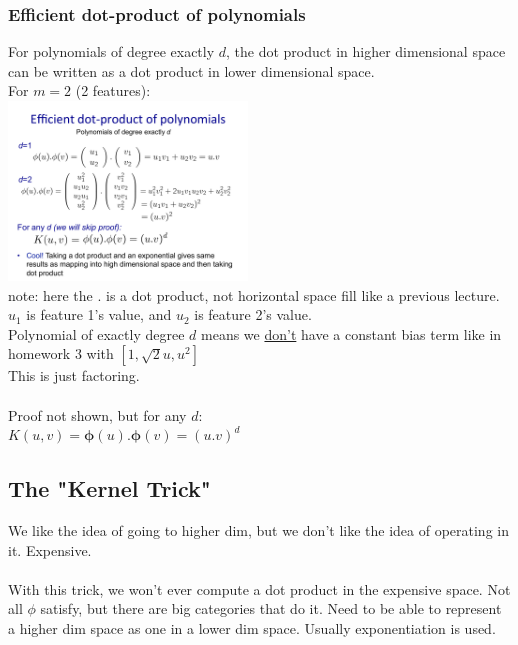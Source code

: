 \subsubsection{Efficient dot-product of polynomials}
For polynomials of degree exactly $d$, the dot product in higher dimensional space can be written as a dot product in lower dimensional space.  \hfill \\
For $m=2$ (2 features): \hfill \\
\includegraphics[width=2.5in]{figures/kernel_dot_polynomials.pdf}  \hfill \\
note: here the $.$ is a dot product, not horizontal space fill like a previous lecture. \hfill \\
$u_1$ is feature 1's value, and $u_2$ is feature 2's value. \hfill \\
Polynomial of exactly degree $d$ means we \underline{don't} have a constant bias term like in homework 3 with $[1, \sqrt{2}u, u^2]$  \hfill \\
This is just factoring.  \hfill \\
\hfill \\

Proof not shown, but for any $d$: \hfill \\
$K(u, v) = \bm{\phi}(u).\bm{\phi}(v) = (u.v)^d$

\subsection{The "Kernel Trick"}

We like the idea of going to higher dim, but we don't like the idea of operating in it.  Expensive. \hfill \\
\hfill \\

With this trick, we won't ever compute a dot product in the expensive space.   %
Not all $\phi$ satisfy, but there are big categories that do it.  %
Need to be able to represent a higher dim space as one in a lower dim space.  %
Usually exponentiation is used.  %
\hfill \\ \hfill \\

